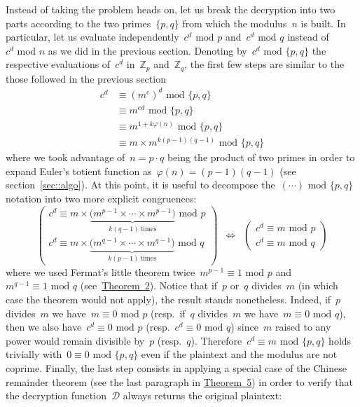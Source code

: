 \documentclass{article}
\begin{document}
\noindent Instead of taking the problem heads on, let us break the decryption into two parts according to the two primes~$\{ p, q\}$ from which the modulus~$n$ is built. In particular, let us evaluate independently~$c^d \,\,\text{mod}\,\, p$ and~$c^d \,\,\text{mod}\,\, q$ instead of~$c^d \,\,\text{mod}\,\,n$ as we did in the previous section.  Denoting by~$c^d\,\,\text{mod}\,\,\{p,q\}$ the respective evaluations of~$c^d$ in~$\mathbb{Z}_p$ and~$\mathbb{Z}_q$, the first few steps are similar to the those followed in the previous section
\begin{align*}
c^d &\equiv (m^{e})^d \,\,\text{mod}\,\, \{p, q\} \\[0.3em]
&\equiv m^{ed} \,\,\text{mod}\,\, \{p, q\} \\[0.3em]
&\equiv m^{1 + k\varphi(n)} \,\,\text{mod}\,\, \{p, q\} \\[0.3em]
&\equiv m \times m^{k(p-1)(q-1)} \,\,\text{mod}\,\, \{p, q\}
\end{align*}
where we took advantage of~$n = p\cdot q$ being the product of two primes in order to expand Euler's totient function as~$\varphi(n) = (p-1)(q-1)$ (see section~\ref{sec::algo}).  At this point, it is useful to decompose the~$(\cdots) \,\,\text{mod}\,\,\{p,q\}$ notation into two more explicit congruences:
\begin{equation*}
\begin{pmatrix}
c^d \equiv m \times \underbrace{\big( m^{p-1} \times \cdots \times m^{p-1}  \big)}_{k(q-1) \, \text{times}} \,\,\text{mod}\,\, p \\
c^d \equiv m \times \underbrace{\big( m^{q-1} \times \cdots \times m^{q-1}  \big)}_{k(p-1) \, \text{times}} \,\,\text{mod}\,\, q
\end{pmatrix} \,\,\, \Longleftrightarrow \,\,\, \begin{pmatrix}
c^d \equiv m\,\,\text{mod}\,\,p \\
c^d \equiv m\,\,\text{mod}\,\,q
\end{pmatrix}
\end{equation*}
where we used Fermat's little theorem twice~$m^{p-1} \equiv 1 \,\,\text{mod}\,\,p$ and~$m^{q-1} \equiv 1 \,\,\text{mod}\,\,q$ (see~\hyperlink{theorem2}{Theorem~2}).  Notice that if~$p$ or~$q$ divides~$m$ (in which case the theorem would not apply), the result stands nonetheless.  Indeed, if~$p$ divides~$m$ we have~$m\equiv 0\,\,\text{mod}\,\,p$ (resp.\ if~$q$ divides~$m$ we have~$m\equiv 0\,\,\text{mod}\,\,q$), then we also have~$c^d\equiv 0\,\,\text{mod}\,\,p$ (resp.~$c^d\equiv 0\,\,\text{mod}\,\,q$) since~$m$ raised to any power would remain divisible by~$p$ (resp.~$q$). Therefore~$c^d \equiv m \,\,\text{mod}\,\,\{p,q\}$ holds trivially with~$0\equiv0\,\,\text{mod}\,\,\{p,q\}$ even if the plaintext and the modulus are not coprime.  Finally, the last step consists in applying a special case of the Chinese remainder theorem (see the last paragraph in \hyperlink{theorem5}{Theorem~5}) in order to verify that the decryption function~$\mathcal{D}$ always returns the original plaintext:
\end{document}
